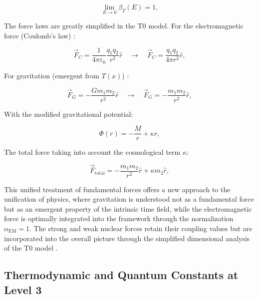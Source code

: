 \documentclass[twocolumn,aps,prl]{revtex4-2}
\begin{document}
	\begin{equation}
		\lim_{E \to 0} \beta_T(E) = 1, \label{eq:beta_IR_limit}
	\end{equation}
	
	The force laws are greatly simplified in the T0 model. For the electromagnetic force (Coulomb's law) \cite{Feynman1985}:
	
	\begin{equation}
		\vec{F}_C = \frac{1}{4\pi \varepsilon_0} \frac{q_1 q_2}{r^2} \hat{r} \quad \to \quad \vec{F}_C = \frac{q_1 q_2}{4\pi r^2} \hat{r}, \label{eq:coulomb_t0}
	\end{equation}
	
	For gravitation (emergent from $T(x)$) \cite{pascher_emergente_2025}:
	
	\begin{equation}
		\vec{F}_G = -\frac{G m_1 m_2}{r^2} \hat{r} \quad \to \quad \vec{F}_G = -\frac{m_1 m_2}{r^2} \hat{r}, \label{eq:gravity_t0}
	\end{equation}
	
	With the modified gravitational potential:
	
	\begin{equation}
		\Phi(r) = -\frac{M}{r} + \kappa r, \label{eq:detailed_mod_potential}
	\end{equation}
	
	The total force taking into account the cosmological term $\kappa$:
	
	\begin{equation}
		\vec{F}_{\text{total}} = -\frac{m_1 m_2}{r^2} \hat{r} + \kappa m_2 \hat{r}, \label{eq:total_force}
	\end{equation}
	
	This unified treatment of fundamental forces offers a new approach to the unification of physics, where gravitation is understood not as a fundamental force but as an emergent property of the intrinsic time field, while the electromagnetic force is optimally integrated into the framework through the normalization $\alpha_{\text{EM}} = 1$. The strong and weak nuclear forces retain their coupling values but are incorporated into the overall picture through the simplified dimensional analysis of the T0 model \cite{pascher_emergente_2025}.
	
	\subsection{Thermodynamic and Quantum Constants at Level 3}
	\label{subsec:level3_thermo_quantum}
	
\end{document}
